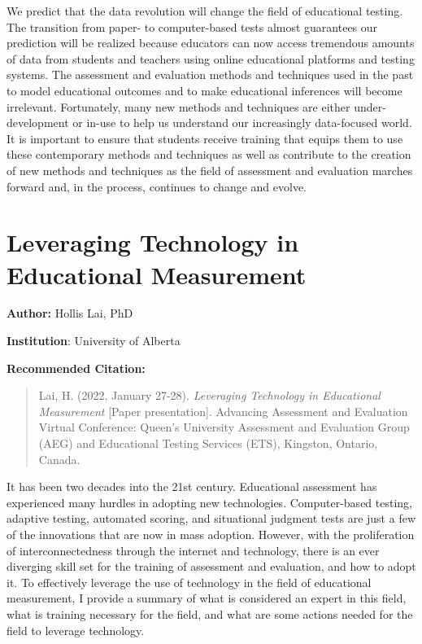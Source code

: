 \documentclass[
]{book}
\begin{document}
We predict that the data revolution will change the field of educational testing. The transition from paper- to computer-based tests almost guarantees our prediction will be realized because educators can now access tremendous amounts of data from students and teachers using online educational platforms and testing systems. The assessment and evaluation methods and techniques used in the past to model educational outcomes and to make educational inferences will become irrelevant. Fortunately, many new methods and techniques are either under-development or in-use to help us understand our increasingly data-focused world. It is important to ensure that students receive training that equips them to use these contemporary methods and techniques as well as contribute to the creation of new methods and techniques as the field of assessment and evaluation marches forward and, in the process, continues to change and evolve.

\newpage

\hypertarget{leveraging-technology-in-educational-measurement}{%
\section{Leveraging Technology in Educational Measurement}\label{leveraging-technology-in-educational-measurement}}

\textbf{Author:} Hollis Lai, PhD

\textbf{Institution}: University of Alberta

\textbf{Recommended Citation:}

\begin{quote}
Lai, H. (2022, January 27-28). \emph{Leveraging Technology in Educational Measurement} {[}Paper presentation{]}. Advancing Assessment and Evaluation Virtual Conference: Queen's University Assessment and Evaluation Group (AEG) and Educational Testing Services (ETS), Kingston, Ontario, Canada.
\end{quote}

It has been two decades into the 21st century. Educational assessment has experienced many hurdles in adopting new technologies. Computer-based testing, adaptive testing, automated scoring, and situational judgment tests are just a few of the innovations that are now in mass adoption. However, with the proliferation of interconnectedness through the internet and technology, there is an ever diverging skill set for the training of assessment and evaluation, and how to adopt it. To effectively leverage the use of technology in the field of educational measurement, I provide a summary of what is considered an expert in this field, what is training necessary for the field, and what are some actions needed for the field to leverage technology.
\end{document}
